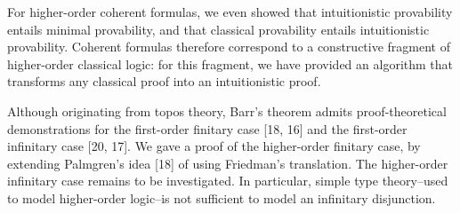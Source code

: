 \documentclass[10pt,a4paper]{article}
\begin{document}
 
 
For higher-order coherent formulas, we even showed that intuitionistic provability entails minimal provability, and that classical provability entails intuitionistic provability. Coherent formulas therefore correspond to a constructive fragment of higher-order classical logic: for this fragment, we have provided an algorithm that transforms any classical proof into an intuitionistic proof.\par
 
 
 
Although originating from topos theory, Barr’s theorem admits proof-theoretical demonstrations for the first-order finitary case [18, 16] and the first-order infinitary case [20, 17]. We gave a proof of the higher-order finitary case, by extending Palmgren’s idea [18] of using Friedman’s translation. The higher-order infinitary case remains to be investigated. In particular, simple type theory–used to model higher-order logic–is not sufficient to model an infinitary disjunction.\par
 
 
\end{document}
